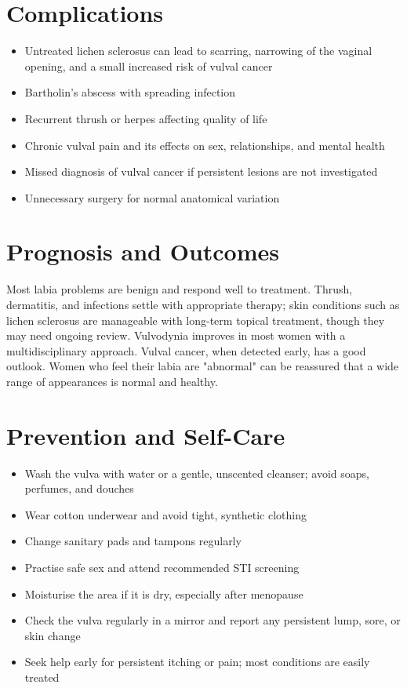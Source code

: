 \section*{Complications}
\begin{itemize}
    \item Untreated lichen sclerosus can lead to scarring, narrowing of the vaginal opening, and a small increased risk of vulval cancer
    \item Bartholin's abscess with spreading infection
    \item Recurrent thrush or herpes affecting quality of life
    \item Chronic vulval pain and its effects on sex, relationships, and mental health
    \item Missed diagnosis of vulval cancer if persistent lesions are not investigated
    \item Unnecessary surgery for normal anatomical variation
\end{itemize}

\section*{Prognosis and Outcomes}
Most labia problems are benign and respond well to treatment. Thrush, dermatitis, and infections settle with appropriate therapy; skin conditions such as lichen sclerosus are manageable with long-term topical treatment, though they may need ongoing review. Vulvodynia improves in most women with a multidisciplinary approach. Vulval cancer, when detected early, has a good outlook. Women who feel their labia are "abnormal" can be reassured that a wide range of appearances is normal and healthy.

\section*{Prevention and Self-Care}
\begin{itemize}
    \item Wash the vulva with water or a gentle, unscented cleanser; avoid soaps, perfumes, and douches
    \item Wear cotton underwear and avoid tight, synthetic clothing
    \item Change sanitary pads and tampons regularly
    \item Practise safe sex and attend recommended STI screening
    \item Moisturise the area if it is dry, especially after menopause
    \item Check the vulva regularly in a mirror and report any persistent lump, sore, or skin change
    \item Seek help early for persistent itching or pain; most conditions are easily treated
\end{itemize}


